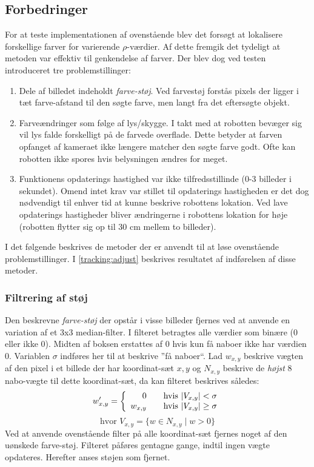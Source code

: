 \subsection{Forbedringer}\label{tracking:improvements}
For at teste implementationen af ovenstående blev det forsøgt at lokalisere forskellige farver for varierende $\rho$-værdier.
Af dette fremgik det tydeligt at metoden var effektiv til genkendelse af farver.
Der blev dog ved testen introduceret tre problemstillinger:
\begin{enumerate}
\item Dele af billedet indeholdt \emph{farve-støj}.
Ved farvestøj forstås pixels der ligger i tæt farve-afstand til den søgte farve, men langt fra det eftersøgte objekt.
\item Farveændringer som følge af lys/skygge.
I takt med at robotten bevæger sig vil lys falde forskelligt på de farvede overflade.
Dette betyder at farven opfanget af kameraet ikke længere matcher den søgte farve godt.
Ofte kan robotten ikke spores hvis belysningen ændres for meget.
\item Funktionens opdaterings hastighed var ikke tilfredsstillinde (0-3 billeder i sekundet).
Omend intet krav var stillet til opdaterings hastigheden er det dog nødvendigt til enhver tid at kunne beskrive robottens lokation.
Ved lave opdaterings hastigheder bliver ændringerne i robottens lokation for høje (robotten flytter sig op til 30 cm mellem to billeder).
\end{enumerate}

I det følgende beskrives de metoder der er anvendt til at løse ovenstående problemstillinger.
I \cref{tracking:adjust} beskrives resultatet af indførelsen af disse metoder.

\subsubsection{Filtrering af støj}
Den beskrevne \emph{farve-støj} der opstår i visse billeder fjernes ved at anvende en variation af et 3x3 median-filter\cite{medianfilter}.
I filteret betragtes alle værdier som binære (0 eller ikke 0).
Midten af boksen erstattes af 0 hvis kun få naboer ikke har værdien 0.
Variablen $\sigma$ indføres her til at beskrive ''få naboer``.
Lad $w_{x,y}$ beskrive vægten af den pixel i et billede der har koordinat-sæt $x,y$ og $N_{x,y}$ beskrive de \emph{højst} 8 nabo-vægte til dette koordinat-sæt, da kan filteret beskrives således:
\begin{equation}\label{tracking:eq:filter}
w_{x,y}' = \left\{ 
  \begin{array}{r l}
        0 & \quad \text{hvis $|V_{x,y}| < \sigma$} \\
        w_{x,y} & \quad \text{hvis $|V_{x,y}| \geq \sigma$}
  \end{array} \right.
\end{equation}
$$\text{hvor } V_{x,y} = \{ w \in N_{x,y} \mid w > 0 \}$$
Ved at anvende ovenstående filter på alle koordinat-sæt fjernes noget af den uønskede farve-støj.
Filteret påføres gentagne gange, indtil ingen vægte opdateres.
Herefter anses støjen som fjernet.

